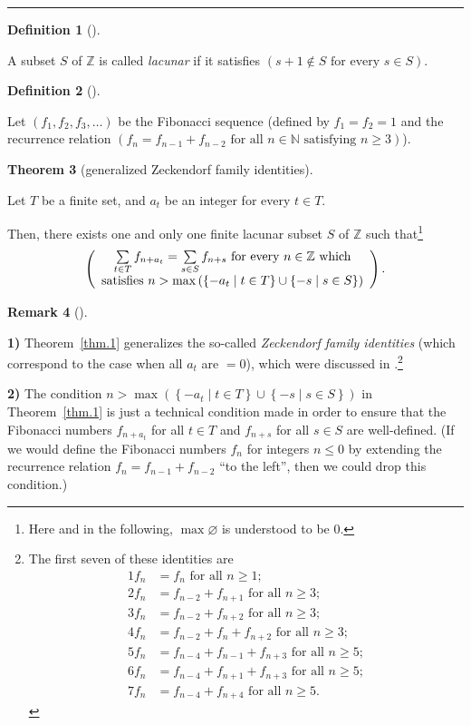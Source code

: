 \documentclass[numbers=enddot,12pt,final,onecolumn,notitlepage]{scrartcl}%
\numberwithin{exer}{section}
\theoremstyle{definition}
\newtheorem{theo}{Theorem}[section]
\newenvironment{theorem}[1][]
{\begin{theo}[#1]\begin{leftbar}}
{\end{leftbar}\end{theo}}
\newtheorem{defi}[theo]{Definition}
\newenvironment{definition}[1][]
{\begin{defi}[#1]\begin{leftbar}}
{\end{leftbar}\end{defi}}
\newtheorem{remk}[theo]{Remark}
\newenvironment{remark}[1][]
{\begin{remk}[#1]\begin{leftbar}}
{\end{leftbar}\end{remk}}
\let\sumnonlimits\sum
\renewcommand{\sum}{\sumnonlimits\limits}
\begin{document}
\hrule


\begin{definition}
A subset $S$ of $\mathbb{Z}$ is called
\textit{lacunar} if it satisfies $\left(  s+1\notin S\text{ for every }s\in
S\right)  $.
\end{definition}

\begin{definition}
Let $\left(  f_{1},f_{2},f_{3},\ldots\right)  $ be the Fibonacci
sequence (defined by $f_{1}=f_{2}=1$ and the recurrence relation $\left(
f_{n}=f_{n-1}+f_{n-2}\text{ for all }n\in\mathbb{N}\text{ satisfying }%
n\geq3\right)  $).
\end{definition}

\begin{theorem}[generalized Zeckendorf family identities]\label{thm.1}
Let $T$ be a
finite set, and $a_{t}$ be an integer for every $t\in T$.

Then, there exists one and only one finite lacunar subset $S$ of $\mathbb{Z}$
such that\footnote{Here and in the following, $\max\varnothing$ is understood
to be $0$.}
\[
\left(
\begin{array}
[c]{c}%
\sum\limits_{t\in T}f_{n+a_{t}}=\sum\limits_{s\in S}f_{n+s}\text{ for every
}n\in\mathbb{Z}\text{ which}\\
\text{satisfies }n>\max\left(  \left\{  -a_{t}\mid t\in T\right\}
\cup\left\{  -s\mid s\in S\right\}  \right)
\end{array}
\right)  .
\]

\end{theorem}

\begin{remark}
\textbf{1)} Theorem~\ref{thm.1} generalizes the so-called \textit{Zeckendorf family
identities} (which correspond to the case when all $a_{t}$ are $=0$), which
were discussed in \cite{1}.\footnote{The first seven of these identities are%
\begin{align*}
1f_{n}  &  =f_{n}\text{ for all }n\geq1;\\
2f_{n}  &  =f_{n-2}+f_{n+1}\text{ for all }n\geq3;\\
3f_{n}  &  =f_{n-2}+f_{n+2}\text{ for all }n\geq3;\\
4f_{n}  &  =f_{n-2}+f_{n}+f_{n+2}\text{ for all }n\geq3;\\
5f_{n}  &  =f_{n-4}+f_{n-1}+f_{n+3}\text{ for all }n\geq5;\\
6f_{n}  &  =f_{n-4}+f_{n+1}+f_{n+3}\text{ for all }n\geq5;\\
7f_{n}  &  =f_{n-4}+f_{n+4}\text{ for all }n\geq5.
\end{align*}
}

\textbf{2)} The condition $n>\max\left(  \left\{  -a_{t}\mid t\in T\right\}
\cup\left\{  -s\mid s\in S\right\}  \right)  $ in Theorem~\ref{thm.1} is just a
technical condition made in order to ensure that the Fibonacci numbers
$f_{n+a_{t}}$ for all $t\in T$ and $f_{n+s}$ for all $s\in S$ are
well-defined. (If we would define the Fibonacci numbers $f_{n}$ for integers
$n\leq0$ by extending the recurrence relation $f_{n}=f_{n-1}+f_{n-2}$ ``to the
left'', then we could drop this condition.)
\end{remark}
\end{document}
